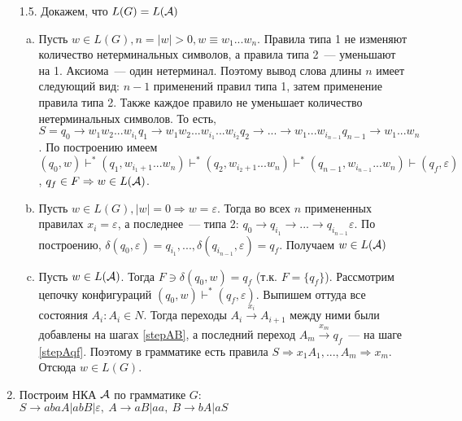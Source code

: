 \documentclass[a4paper]{article}
\def\A{{\cal A}}
\begin{document}
\begin{enumerate}
\begin{enumerate}[1.]
\begin{enumerate}[a.]
\begin{enumerate}[1.]
\end{enumerate}
\end{enumerate}
\end{enumerate}
\item[1.5.] Докажем, что $L(G)=L(\A)$\begin{enumerate}[a.]
\item Пусть $w\in L(G), n=|w|>0,w\equiv w_1...w_n$. Правила типа 1 не изменяют количество нетерминальных символов, а правила типа 2~--- уменьшают на 1. Аксиома~--- один нетерминал. Поэтому вывод слова длины $n$ имеет следующий вид: $n-1$ применений правил типа 1, затем применение правила типа 2. Также каждое правило не уменьшает количество нетерминальных символов. То есть, $S=q_0\longrightarrow w_1w_2...w_{i_1}q_1\longrightarrow w_1w_2...w_{i_1}...w_{i_2}q_2\longrightarrow...\longrightarrow w_1...w_{i_{n-1}}q_{n-1}\longrightarrow w_1...w_n$. По построению имеем $(q_0,w)\vdash^*(q_1,w_{i_1+1}...w_n)\vdash^*(q_2,w_{i_2+1}...w_n)\vdash^*(q_{n-1},w_{i_{n-1}}...w_n)\vdash(q_f,\varepsilon)$, $q_f\in F\Rightarrow w\in L(\A)$.
\item Пусть $w\in L(G), |w|=0\Rightarrow w=\varepsilon$. Тогда во всех $n$ примененных правилах $x_i=\varepsilon$, а последнее~--- типа 2: $q_0\longrightarrow q_{i_1}\longrightarrow...\longrightarrow q_{i_{n-1}} \varepsilon$. По построению, $\delta(q_0,\varepsilon)=q_{i_1},...,\delta(q_{i_{n-1}},\varepsilon)=q_f$. Получаем $w\in L(\A)$
\item Пусть $w\in L(\A)$. Тогда $F\ni\delta(q_0,w)=q_f$ (т.к. $F=\{q_f\}$). Рассмотрим цепочку конфигураций $(q_0,w)\vdash^*(q_f,\varepsilon)$. Выпишем оттуда все состояния $A_i\colon A_i\in N$. Тогда переходы $A_i\overset{x_i}{\longrightarrow}A_{i+1}$ между ними были добавлены на шагах \ref{stepAB}, а последний переход $A_m\overset{x_m}{\longrightarrow} q_f$~--- на шаге \ref{stepAqf}. Поэтому в грамматике есть правила $S\Rightarrow x_1A_1,...,A_m\Rightarrow x_m$. Отсюда $w\in L(G)$.
\end{enumerate}
\item Построим НКА $\A$ по грамматике $G$: $S\longrightarrow abaA|abB|\varepsilon,\ A\longrightarrow  aB|aa,\ B\longrightarrow bA|aS$
\begin{center}
\end{center}
\end{enumerate}
\end{document}
